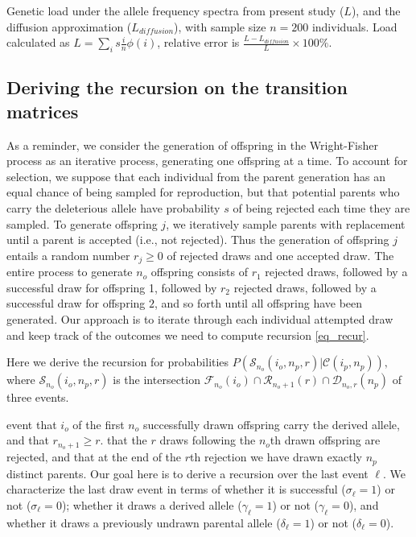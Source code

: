 \documentclass[9pt,twocolumn,twoside,lineno]{gsajnl}
\newcommand{\CC}{\mathcal{C}}
\newcommand{\ms}{\mathcal{S}}
\begin{document}
\begin{table}
    \caption{\label{tab_apx_load} Genetic load under the allele frequency
    spectra from present study ($L$), and the diffusion approximation
    ($L_{diffusion}$), with sample size $n=200$ individuals. Load calculated as
    $L=\sum_i s \frac{i}{n} \phi(i)$, relative error is
    $\frac{L-L_{diffusion}}{L}\times100\%$. }

\end{table}

\subsection{Deriving the recursion on the transition matrices}
\label{subsec_apx_tpm_deriv}
As a reminder, we consider the generation of offspring in the Wright-Fisher process as an iterative process, generating one offspring at a time. To account for selection, we suppose that each individual from the parent generation has an equal chance of being sampled for reproduction, but that potential parents who carry the deleterious allele have probability $s$ of being rejected each time they are sampled.  
To generate offspring $j$, we iteratively sample parents with replacement until a parent is accepted (i.e., not rejected). Thus the generation of offspring $j$ entails a random number $r_j\geq 0$ of rejected draws and one accepted draw. The entire process to generate $n_o$ offspring consists of $r_1$ rejected draws, followed by a successful draw for offspring 1, followed by $r_2$ rejected draws, followed by a successful draw for offspring $2$, and so forth until all offspring have been generated. Our approach is to iterate through each individual attempted draw and keep track of the outcomes we need to compute recursion \eqref{eq_recur}.

Here we derive the recursion for
probabilities $P(\ms_{n_o}(i_o, n_p, r) | \CC{(i_p,n_p)} ),$ where $\ms_{n_o}(i_o,n_p, r)$ is the intersection $\mathcal{F}_{n_o}(i_o) \cap \mathcal{R}_{n_o+1}(r) \cap \mathcal{D}_{n_o, r}(n_p)$ of three events. 

event that $i_o$ of the first $n_o$ successfully drawn offspring carry the derived allele, and that $r_{n_o+1} \geq r.$ 
that the $r$
draws following the $n_o$th drawn offspring are rejected, and that at the end of the $r$th
rejection we have drawn exactly $n_p$ distinct parents. Our goal here is to derive a recursion
over the last event $\ell$. We characterize the last draw event in terms of whether it is
successful ($\sigma_\ell=1$) or not ($\sigma_\ell=0$); whether it draws a derived allele
($\gamma_\ell=1$) or not ($\gamma_\ell=0$), and whether it draws a previously undrawn parental
allele ($\delta_\ell=1$) or not ($\delta_\ell=0$).
\end{document}
